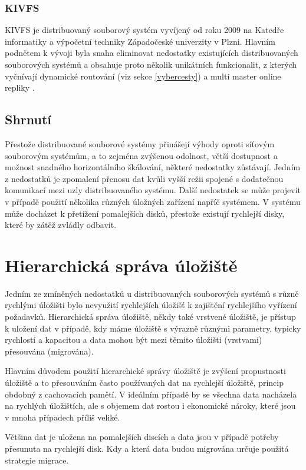 \documentclass[czech,DP]{thesiskiv}
\begin{document}
\subsubsection*{KIVFS} 
KIVFS je distribuovaný souborový systém vyvíjený od roku 2009 na Katedře informatiky a výpočetní techniky Západočeské univerzity v Plzni. Hlavním podnětem k vývoji byla snaha eliminovat nedostatky existujících distribuovaných souborových systémů a obsahuje proto několik unikátních funkcionalit, z kterých vyčnívají dynamické routování (viz sekce \ref{vybercesty}) a multi master online repliky \cite{kivfsreplicapaper}. 

\subsection{Shrnutí}

Přestože distribuované souborové systémy přinášejí výhody oproti síťovým souborovým systémům, a to zejména zvýšenou odolnost, větší dostupnost a možnost snadného horizontálního škálování, některé nedostatky zůstávají. Jedním z nedostatků je zpomalení přenosu dat kvůli vyšší režii spojené s dodatečnou komunikací mezi uzly distribuovaného systému. Další nedostatek se může projevit v případě použití několika různých úložných zařízení napříč systémem. V systému může docházet k přetížení pomalejších disků, přestože existují rychlejší disky, které by zátěž zvládly odbavit.

\section{Hierarchická správa úložiště}

Jedním ze zmíněných nedostatků u distribuovaných souborových systémů s různě rychlými úložišti bylo nevyužití rychlejších úložišť k zajištění rychlejšího vyřízení požadavků. Hierarchická správa úložiště, někdy také vrstvené úložiště, je přístup k uložení dat v případě, kdy máme úložiště s výrazně různými parametry, typicky rychlostí a kapacitou a data mohou být mezi těmito úložišti (vrstvami) přesouvána (migrována).

Hlavním důvodem použití hierarchické správy úložiště je zvýšení propustnosti úložiště a to přesouváním často používaných dat na rychlejší úložiště, princip obdobný z cachovacích pamětí. V ideálním případě by se všechna data nacházela na rychlých úložištích, ale s objemem dat rostou i ekonomické nároky, které jsou v mnoha případech příliš veliké. 

Většina dat je uložena na pomalejších discích a data jsou v případě potřeby přesunuta na rychlejší disk. Kdy a která data budou migrována určuje použitá strategie migrace.
\end{document}
